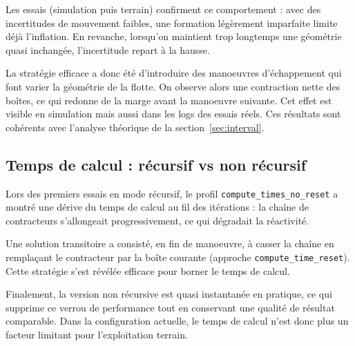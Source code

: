 Les essais (simulation puis terrain) confirment ce comportement : avec des incertitudes de mouvement faibles, une formation légèrement imparfaite limite déjà l'inflation. En revanche, lorsqu'on maintient trop longtemps une géométrie quasi inchangée, l'incertitude repart à la hausse.

La stratégie efficace a donc été d'introduire des manoeuvres d'échappement qui font varier la géométrie de la flotte. On observe alors une contraction nette des boîtes, ce qui redonne de la marge avant la manoeuvre suivante. Cet effet est visible en simulation mais aussi dans les logs des essais réels. Ces résultats sont cohérents avec l'analyse théorique de la section~\ref{sec:interval}.

\subsection{Temps de calcul : récursif vs non récursif}

Lors des premiers essais en mode récursif, le profil \texttt{compute\_times\_no\_reset} a montré une dérive du temps de calcul au fil des itérations : la chaîne de contracteurs s'allongeait progressivement, ce qui dégradait la réactivité.

Une solution transitoire a consisté, en fin de manoeuvre, à casser la chaîne en remplaçant le contracteur par la boîte courante (approche \texttt{compute\_time\_reset}). Cette stratégie s'est révélée efficace pour borner le temps de calcul.

Finalement, la version non récursive est quasi instantanée en pratique, ce qui supprime ce verrou de performance tout en conservant une qualité de résultat comparable. Dans la configuration actuelle, le temps de calcul n'est donc plus un facteur limitant pour l'exploitation terrain.
